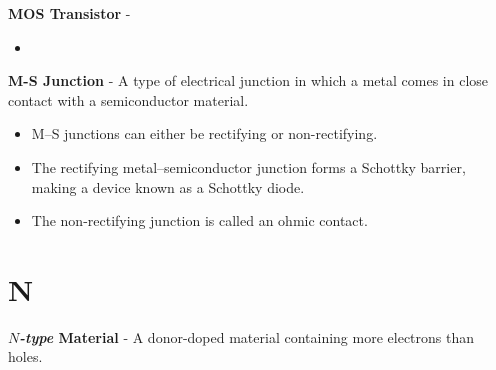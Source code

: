 \vspace{0.5cm}
    \textbf{MOS Transistor} - 
    \vspace{0.15cm}
    \begin{itemize}
        \setlength\itemsep{0.5em}
        \item{}
    \end{itemize}
\vspace{0.5cm}
    \textbf{M-S Junction} - A type of electrical junction in which a metal comes in close contact with a semiconductor material.
    \vspace{0.15cm}
    \begin{itemize}
        \setlength\itemsep{0.5em}
        \item{M–S junctions can either be rectifying or non-rectifying.}
        \item{The rectifying metal–semiconductor junction forms a Schottky barrier, making a device known as a Schottky diode.}
        \item{The non-rectifying junction is called an ohmic contact.}
    \end{itemize}
\section{N}
    \textbf{$N$\emph{-type} Material} - A donor-doped material containing more electrons than holes.
